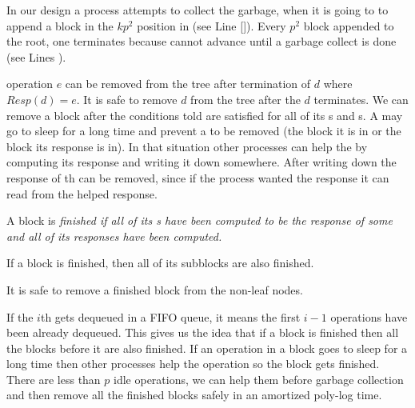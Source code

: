 In our design a process attempts to collect the garbage, when it is going to to append a block in the $kp^2$ position in  (see Line \ref{}). Every $p^2$  block appended to the root, one  terminates because  cannot advance until a  garbage collect is done (see Lines ).

%

 operation $e$ can be removed from the tree after termination of  $d$ where $Resp(d)=e$. It is safe to remove  $d$ from the tree after the $d$ terminates. We can remove a block after the conditions told are satisfied for all of its s and s. A  may go to sleep for a long time and prevent a  to be removed (the block it is in or the block its response is in). In that situation other processes can help the  by computing its response and writing it down somewhere. After writing down the response of th  can be removed, since if the process wanted the response it can read from the helped response.

\begin{definition}
A block  is \it{finished} if all of its s have been computed to be the response of some  and all of its  responses have been computed.  
\end{definition}

\begin{corollary}
If a block is finished, then all of its subblocks are also finished.  
\end{corollary}

\begin{lemma}
It is safe to remove a finished block from the non-leaf nodes.
\end{lemma}

If the $i$th  gets dequeued in a FIFO queue, it means the first $i-1$  operations have been already dequeued. This gives us the idea that if a block is finished then all the blocks before it are also finished. If an operation in a block goes to sleep for a long time then other processes help the operation so the block gets finished. There are less than $p$ idle operations, we can help them before garbage collection and then remove all the finished blocks safely in an amortized poly-log time.

